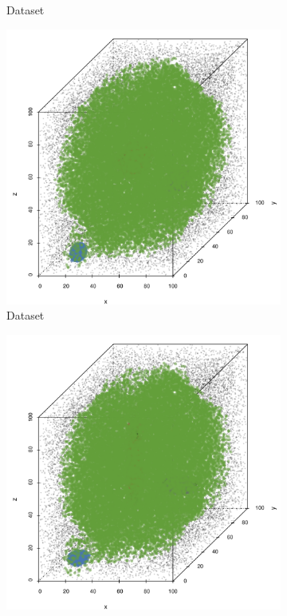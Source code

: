 \begin{figure}
\begin{subfigure}{0.23\textwidth}
			\caption{Dataset \baakmanTwo}
			\label{fig:discussion:performance:mbeLowerError:baakman2}
		\end{subfigure}	
		\begin{subfigure}{0.23\textwidth}
			\centering
			\includegraphics[keepaspectratio=true, width=\textwidth, height=0.23\textheight]{discussion/img/ferdosi_3_abs_error_mbeSmallerThansambe}
			\caption{Dataset \ferdosiThree}
			\label{fig:discussion:performance:mbeLowerError:ferdosi3}
		\end{subfigure}
		\begin{subfigure}{0.23\textwidth}
			\centering
			\includegraphics[keepaspectratio=true, width=\textwidth, height=0.23\textheight]{discussion/img/baakman_3_abs_error_mbeSmallerThansambe}

\end{subfigure}
\end{figure}
